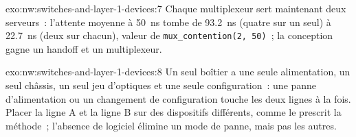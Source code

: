 \begin{solution}{exo:nw:switches-and-layer-1-devices:7}
Chaque multiplexeur sert maintenant deux serveurs~: l'attente moyenne à \qty{50}{\nano\second} tombe de 93.2~ns (quatre sur un seul) à 22.7~ns (deux
sur chacun), valeur de \texttt{mux\_contention(2, 50)}~; la conception gagne un handoff et un multiplexeur.
\end{solution}

\begin{solution}{exo:nw:switches-and-layer-1-devices:8}
Un seul boîtier a une seule alimentation, un seul châssis, un seul jeu d'optiques et une seule configuration~: une panne d'alimentation ou un changement de configuration touche
les deux lignes à la fois. Placer la ligne A et la ligne B sur des dispositifs différents, comme le prescrit la méthode~; l'absence de logiciel élimine un mode de panne,
mais pas les autres.
\end{solution}

